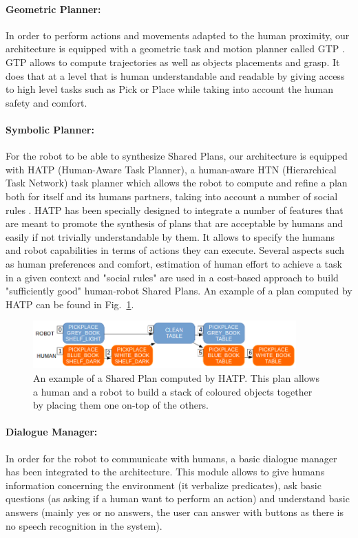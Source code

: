 \documentclass[english,a4paper,11pt,twoside]{StyleThese}
\begin{document}
\paragraph{Geometric Planner:}
In order to perform actions and movements adapted to the human proximity, our architecture is equipped with a geometric task and motion planner called GTP \cite{waldhart2016novel}. GTP allows to compute trajectories as well as objects placements and grasp. It does that at a level that is human understandable and readable by giving access to high level tasks such as Pick or Place while taking into account the human safety and comfort.

\paragraph{Symbolic Planner:}
For the robot to be able to synthesize Shared Plans, our architecture is equipped with HATP (Human-Aware Task Planner), a human-aware HTN (Hierarchical Task Network) task planner which allows the robot to compute and refine a plan both for itself and its humans partners, taking into account a number of social rules \cite{Lallement2014hatp}.
HATP has been specially designed to integrate a number of features that are meant to promote the synthesis of plans that are acceptable by humans and easily if not trivially understandable by them. It allows to specify the humans and robot capabilities in terms of actions they can execute. Several aspects such as human preferences and comfort, estimation of human effort to achieve a task in a given context and "social rules" are used in a cost-based approach to build "sufficiently good" human-robot Shared Plans. An example of a plan computed by HATP can be found in Fig.~\ref{fig:planHATP}.

\begin{figure}[!h]
	\centering
    \includegraphics[width=0.9\textwidth]{figs/Chapter2/SharedPlan.png}
    \caption{An example of a Shared Plan computed by HATP. This plan allows a human and a robot to build a stack of coloured objects together by placing them one on-top of the others.}
    \label{fig:planHATP}
\end{figure}


\paragraph{Dialogue Manager:}
In order for the robot to communicate with humans, a basic dialogue manager has been integrated to the architecture. This module allows to give humans information concerning the environment (it verbalize predicates), ask basic questions (as asking if a human want to perform an action) and understand basic answers (mainly yes or no answers, the user can answer with buttons as there is no speech recognition in the system). 
\end{document}
